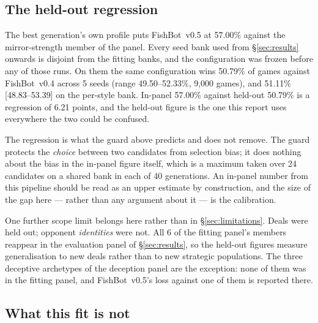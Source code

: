 \documentclass[11pt]{article}
\theoremstyle{definition}
\DeclareRobustCommand{\vfive}{\texorpdfstring{\mbox{FishBot v0.5}}{FishBot v0.5}}
\DeclareRobustCommand{\vfour}{\texorpdfstring{\mbox{FishBot v0.4}}{FishBot v0.4}}
\providecommand{\numHeadWin}{50.79}
\providecommand{\numHeadRange}{49.50--52.33}
\providecommand{\numHeadSeeds}{5}
\providecommand{\numHeadGames}{9{,}000}
\providecommand{\numHeadGames}{9{,}000}
\providecommand{\numStyleCIVfour}{48.83--53.39}
\providecommand{\numPanelVfiveVfour}{51.11}
\providecommand{\numFitGens}{40}
\providecommand{\numFitWorst}{57.00}
\providecommand{\numFitPop}{24}
\providecommand{\numFitPanelN}{6}
\providecommand{\numFitRegression}{6.21}
\begin{document}
\subsection{The held-out regression}
\label{sec:fit-heldout}

The best generation's own profile puts \vfive{} at \numFitWorst\% against the
mirror-strength member of the panel. Every seed bank used from
\S\ref{sec:results} onwards is disjoint from the fitting banks, and the
configuration was frozen before any of those runs. On them the same configuration
wins \numHeadWin\% of games against \vfour{} across \numHeadSeeds{} seeds (range
\numHeadRange\%, \numHeadGames{} games), and \numPanelVfiveVfour\%
[\numStyleCIVfour] on the per-style bank. In-panel \numFitWorst\% against
held-out \numHeadWin\% is a regression of \numFitRegression{} points, and the
held-out figure is the one this report uses everywhere the two could be confused.

The regression is what the guard above predicts and does not remove. The guard
protects the \emph{choice} between two candidates from selection bias; it does
nothing about the bias in the in-panel figure itself, which is a maximum taken
over \numFitPop{} candidates on a shared bank in each of \numFitGens{}
generations. An in-panel number from this pipeline should be read as an upper
estimate by construction, and the size of the gap here --- rather than any
argument about it --- is the calibration.

One further scope limit belongs here rather than in \S\ref{sec:limitations}.
Deals were held out; opponent \emph{identities} were not. All \numFitPanelN{} of
the fitting panel's members reappear in the evaluation panel of
\S\ref{sec:results}, so the held-out figures measure generalisation to new deals
rather than to new strategic populations. The three deceptive archetypes of the
deception panel are the exception: none of them was in the fitting panel, and
\vfive{}'s loss against one of them is reported there.

\subsection{What this fit is not}
\label{sec:fit-limits}
\end{document}
